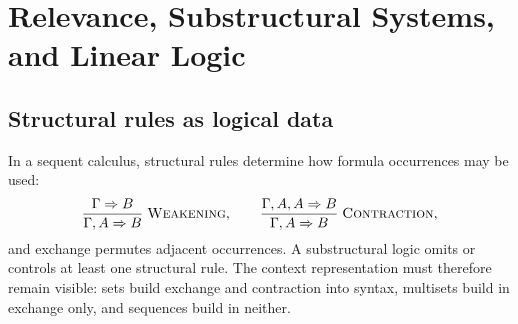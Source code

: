 \chapter[Relevance and Linear Logic]{Relevance, Substructural Systems, and Linear Logic}
\label{ch:relevance-linear}

\section{Structural rules as logical data}
\label{sec:relevance-linear-01}

In a sequent calculus, structural rules determine how formula occurrences may
be used:
\[
\frac{\Gamma\Rightarrow B}{\Gamma,A\Rightarrow B}\;\textsc{Weakening},
\qquad
\frac{\Gamma,A,A\Rightarrow B}{\Gamma,A\Rightarrow B}\;\textsc{Contraction},
\]
and exchange permutes adjacent occurrences.  A substructural logic omits or
controls at least one structural rule.  The context representation must
therefore remain visible: sets build exchange and contraction into syntax,
multisets build in exchange only, and sequences build in neither.

